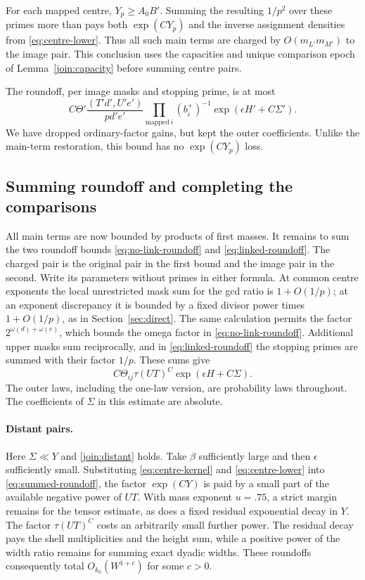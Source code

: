 For each mapped centre, $Y_p\ge A_0B'$. Summing the resulting
$1/p^2$ over these primes more than pays both $\exp(CY_p)$ and the
inverse assignment densities from \eqref{eq:centre-lower}. Thus all
such main terms are charged by $O(m_{L'}m_{M'})$ to the image pair.
This conclusion uses the capacities and unique comparison epoch of
Lemma~\ref{join:capacity} before summing centre pairs.

The roundoff, per image masks and stopping prime, is at most
\begin{equation}\label{eq:linked-roundoff}
 C\Theta'\frac{(T'd',U'e')}{pd'e'}
 \prod_{\mathrm{mapped}\ i}(b_i^+)^{-1}
 \exp(\epsilon H'+C\Sigma').
\end{equation}
We have dropped ordinary-factor gains, but kept the outer coefficients.
Unlike the main-term restoration, this bound has no
$\exp(CY_p)$ loss.

\subsection{Summing roundoff and completing the comparisons}

All main terms are now bounded by products of first masses. It remains
to sum the two roundoff bounds \eqref{eq:no-link-roundoff} and
\eqref{eq:linked-roundoff}. The charged pair is the original pair in
the first bound and the image pair in the second. Write its parameters
without primes in either formula. At common centre exponents the
local unrestricted mask sum for the gcd ratio is $1+O(1/p)$; at an
exponent discrepancy it is bounded by a fixed divisor power times
$1+O(1/p)$, as in Section~\ref{sec:direct}. The same calculation
permits the factor $2^{\omega(d)+\omega(e)}$, which bounds the
omega factor in \eqref{eq:no-link-roundoff}. Additional upper masks
sum reciprocally, and in \eqref{eq:linked-roundoff} the stopping
primes are summed with their factor $1/p$. These sums give
\begin{equation}\label{eq:summed-roundoff}
 C\Theta_{ij}\tau(UT)^C
       \exp(\epsilon H+C\Sigma).
\end{equation}
The outer laws, including the one-law version, are probability laws
throughout. The coefficients of $\Sigma$ in this estimate are
absolute.

\paragraph{Distant pairs.}
Here $\Sigma\ll Y$ and \eqref{join:distant} holds. Take $\beta$
sufficiently large and then $\epsilon$ sufficiently small. Substituting
\eqref{eq:centre-kernel} and \eqref{eq:centre-lower} into
\eqref{eq:summed-roundoff}, the factor $\exp(CY)$ is paid by a small
part of the available negative power of $UT$. With mass exponent
$u=.75$, a strict margin remains for the tensor estimate, as does a
fixed residual exponential decay in $Y$. The factor $\tau(UT)^C$
costs an arbitrarily small further power. The residual decay pays the
shell multiplicities and the height sum, while a positive power of
the width ratio remains for summing exact dyadic widths. These
roundoffs consequently total $O_{k_0}(W^{1+c})$ for some $c>0$.

